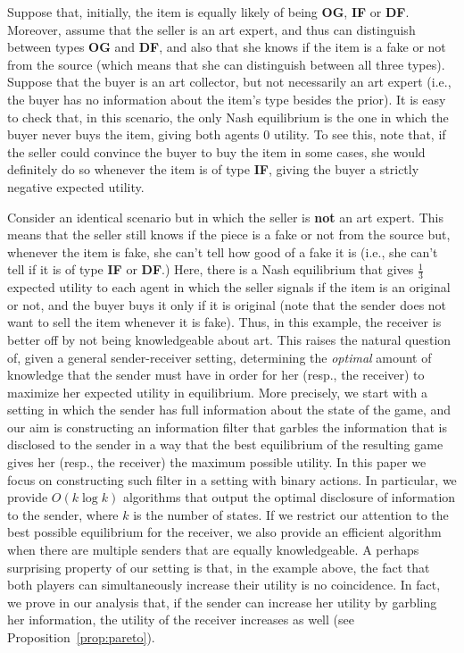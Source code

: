 \documentclass[submission,copyright,creativecommons]{eptcs}
\begin{document}
Suppose that, initially, the item is equally likely of being \textbf{OG}, \textbf{IF} or \textbf{DF}. Moreover, assume that the seller is an art expert, and thus can distinguish between types \textbf{OG} and \textbf{DF}, and also that she knows if the item is a fake or not from the source (which means that she can distinguish between all three types). Suppose that the buyer is an art collector, but not necessarily an art expert (i.e., the buyer has no information about the item's type besides the prior). It is easy to check that, in this scenario, the only Nash equilibrium is the one in which the buyer never buys the item, giving both agents $0$ utility. To see this, note that, if the seller could convince the buyer to buy the item in some cases, she would definitely do so whenever the item is of type \textbf{IF}, giving the buyer a strictly negative expected utility.

Consider an identical scenario but in which the seller is \textbf{not} an art expert. This means that the seller still knows if the piece is a fake or not from the source but, whenever the item is fake, she can't tell how good of a fake it is (i.e., she can't tell if it is of type \textbf{IF} or \textbf{DF}.) Here, there is a Nash equilibrium that gives $\frac{1}{3}$ expected utility to each agent in which the seller signals if the item is an original or not, and the buyer buys it only if it is original (note that the sender does not want to sell the item whenever it is fake). Thus, in this example, the receiver is better off by not being knowledgeable about art. This raises the natural question of, given a general sender-receiver setting, determining the \emph{optimal} amount of knowledge that the sender must have in order for her (resp., the receiver) to maximize her expected utility in equilibrium.  More precisely, we start with a setting in which the sender has full information about the state of the game, and our aim is constructing an information filter that garbles the information that is disclosed to the sender in a way that the best equilibrium of the resulting game gives her (resp., the receiver) the maximum possible utility. In this paper we focus on constructing such filter in a setting with binary actions. In particular, we provide $O(k \log k)$ algorithms that output the optimal disclosure of information to the sender, where $k$ is the number of states. If we restrict our attention to the best possible equilibrium for the receiver, we also provide an efficient algorithm when there are multiple senders that are equally knowledgeable. A perhaps surprising property of our setting is that, in the example above, the fact that both players can simultaneously increase their utility is no coincidence. In fact, we prove in our analysis that, if the sender can increase her utility by garbling her information, the utility of the receiver increases as well (see Proposition~\ref{prop:pareto}). 
\end{document}
